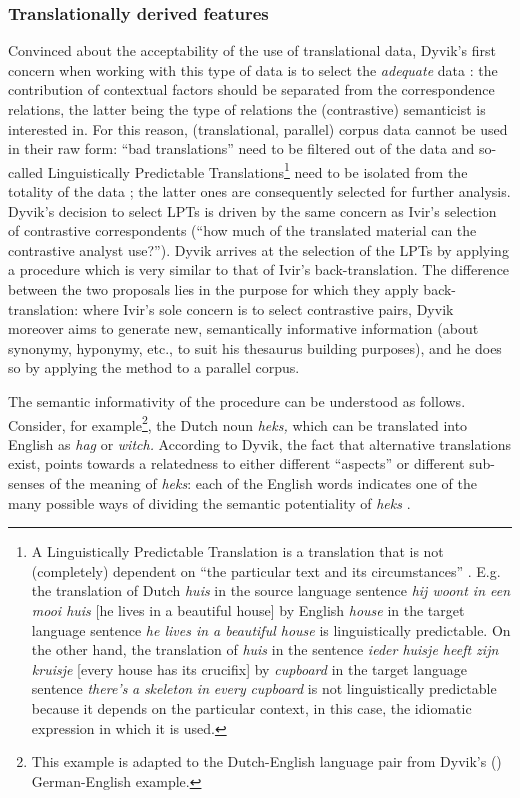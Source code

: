 \subsubsection{Translationally derived features}
\label{sec:2.3.4.2}  
Convinced about the acceptability of the use of translational data, Dyvik’s first concern when working with this type of data is to select the \textit{adequate} data \citep[52]{johansson_translational_1998}: the contribution of contextual factors should be separated from the correspondence relations, the latter being the type of relations the (contrastive) semanticist is interested in. For this reason, (translational, parallel) corpus data cannot be used in their raw form: “bad translations” need to be filtered out of the data and so-called Linguistically Predictable Translations\footnote{A Linguistically Predictable Translation is a translation that is not (completely) dependent on “the particular text and its circumstances” \citep{johansson_translational_1998}. E.g. the translation of Dutch \textit{huis} in the source language sentence \textit{hij woont in een mooi huis} [he lives in a beautiful house] by English \textit{house} in the target language sentence \textit{he lives in a beautiful house} is linguistically predictable. On the other hand, the translation of \textit{huis} in the sentence \textit{ieder huisje heeft zijn kruisje} [every house has its crucifix] by \textit{cupboard} in the target language sentence \textit{there’s} \textit{a} \textit{skeleton} \textit{in} \textit{every} \textit{cupboard} is not linguistically predictable because it depends on the particular context, in this case, the idiomatic expression in which it is used.} need to be isolated from the totality of the data \citep{johansson_translational_1998}; the latter ones are consequently selected for further analysis. Dyvik’s decision to select LPTs is driven by the same concern as Ivir’s selection of contrastive correspondents (“how much of the translated material can the contrastive analyst use?”). Dyvik arrives at the selection of the LPTs by applying a procedure which is very similar to that of Ivir’s back-translation. The difference between the two proposals lies in the purpose for which they apply back-translation: where Ivir’s sole concern is to select contrastive pairs, Dyvik moreover aims to generate new, semantically informative information (about synonymy, hyponymy, etc., to suit his thesaurus building purposes), and he does so by applying the method to a parallel corpus.

The semantic informativity of the procedure can be understood as follows. Consider, for example\footnote{This example is adapted to the Dutch-English language pair from Dyvik’s (\citeyear[29--31]{langemets_translations_2005}) German-English example.}, the Dutch noun \textit{heks,} which can be translated into English as \textit{hag} or \textit{witch.} According to Dyvik, the fact that alternative translations exist, points towards a relatedness to either different ``aspects'' or different sub-senses of the meaning of \textit{heks}: each of the English words indicates one of the many possible ways of dividing the semantic potentiality of \textit{heks} \citep[31]{langemets_translations_2005}.

